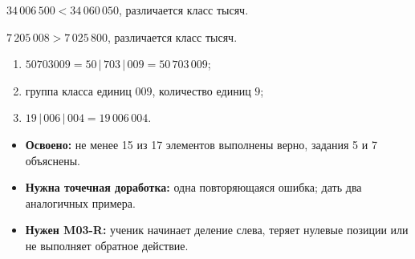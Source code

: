\begin{teacherbox}[6. Сравните]
  \(34\,006\,500<34\,060\,050\), различается класс тысяч.

  \(7\,205\,008>7\,025\,800\), различается класс тысяч.
\end{teacherbox}

\begin{teacherbox}[7. Итог]
  \begin{enumerate}
    \item \(50703009=50\,|\,703\,|\,009=50\,703\,009\);
    \item группа класса единиц \(009\), количество единиц \(9\);
    \item \(19\,|\,006\,|\,004=19\,006\,004\).
  \end{enumerate}
\end{teacherbox}

\begin{resultbox}
  \begin{itemize}
    \item \textbf{Освоено:} не менее 15 из 17 элементов выполнены верно,
      задания 5 и 7 объяснены.
    \item \textbf{Нужна точечная доработка:} одна повторяющаяся ошибка; дать
      два аналогичных примера.
    \item \textbf{Нужен M03-R:} ученик начинает деление слева, теряет нулевые
      позиции или не выполняет обратное действие.
  \end{itemize}
\end{resultbox}
